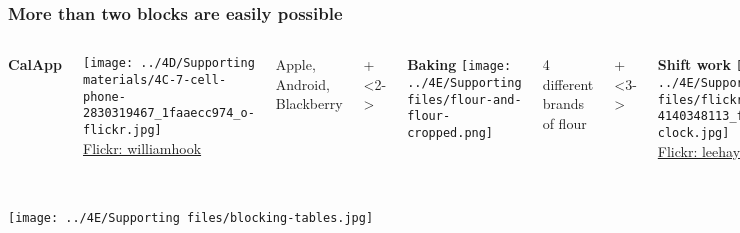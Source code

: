 \begin{frame}\frametitle{More than two blocks are easily possible}
	
	\begin{columns}[t]
			\textbf{CalApp}
			
			\texttt{[image: ../4D/Supporting materials/4C-7-cell-phone-2830319467\_1faaecc974\_o-flickr.jpg]}
			\\
			{\tiny{\href{https://secure.flickr.com/photos/williamhook/2830319467/}{Flickr: williamhook}}}
			
			\vspace{1cm}
			Apple, Android, Blackberry
		
		
			\onslide+<2->{
				\textbf{Baking}
				\texttt{[image: ../4E/Supporting files/flour-and-flour-cropped.png]}
		
				\vspace{1.1cm}
				4 different brands of flour
			}
			
			\onslide+<3->{
				\textbf{Shift work}
				\texttt{[image: ../4E/Supporting files/flickr-4140348113\_f0efc8235b\_z-clock.jpg]}
				\\
				{\tiny{\href{https://secure.flickr.com/photos/leehaywood/4140348113}{Flickr: leehaywood}}}
				
				
				
				\vspace{0.8cm}
				Day shift\\
				Afternoon shift\\
				Night shift
			}
		
			\onslide+<4->{
				\textbf{Gas mileage}
				
				\texttt{[image: ../4D/Supporting materials/4C-6-gas-mileage.png]}
				
				\vspace{1.65cm}
				Gasoline brand 1\\
				Gasoline brand 2\\
				Gasoline brand 3\\
			}
			
	\end{columns}
	
	
\end{frame}

\begin{frame}\frametitle{}
	\centerline{\texttt{[image: ../4E/Supporting files/blocking-tables.jpg]}}
\end{frame}

